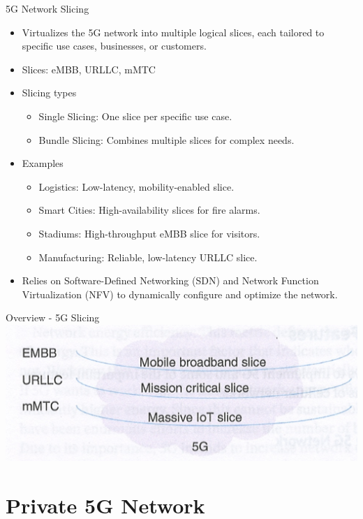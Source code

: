 \documentclass{beamer}
\begin{document}
\begin{frame}{5G Network Slicing}
  \begin{itemize}
    \item Virtualizes the 5G network into multiple logical slices, each tailored to specific use cases, businesses, or customers.
    \item Slices: eMBB, URLLC, mMTC
    \item Slicing types
    \begin{itemize}
        \item Single Slicing: One slice per specific use case.
        \item Bundle Slicing: Combines multiple slices for complex needs.
    \end{itemize}
    \item Examples
    \begin{itemize}
        \item Logistics: Low-latency, mobility-enabled slice.
        \item Smart Cities: High-availability slices for fire alarms.
        \item Stadiums: High-throughput eMBB slice for visitors.
        \item Manufacturing: Reliable, low-latency URLLC slice.
    \end{itemize}
    \item Relies on Software-Defined Networking (SDN) and Network Function Virtualization (NFV) to dynamically configure and optimize the network.
  \end{itemize}
\end{frame}

\begin{frame}{Overview - 5G Slicing}
  \hspace*{0.6em}
  \includegraphics[scale=0.6]{beamer/fig/5g_slices.png}
\end{frame}

\section[Private 5G Network]{Private 5G Network}
\end{document}
